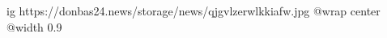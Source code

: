  
 
 
 
 

\ifcmt
  ig https://donbas24.news/storage/news/qjgvlzerwlkkiafw.jpg
  @wrap center
  @width 0.9
\fi
